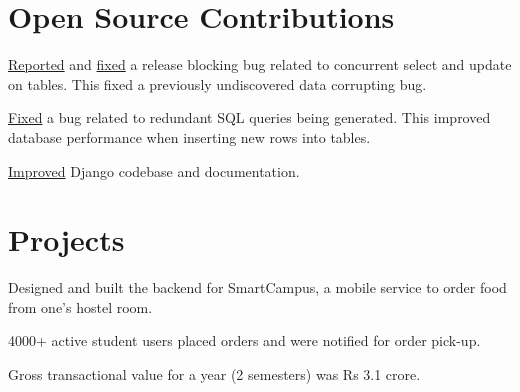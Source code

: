 \documentclass[]{resume}
\begin{document}
\begin{minipage}[t]{0.70\textwidth}
\section{Open Source Contributions}
\vspace{2pt}
\vspace{1pt}
\begin{tightemize}
\item \href{https://code.djangoproject.com/ticket/31246}{Reported} and \href{https://github.com/django/django/pull/12434}{fixed}
a release blocking bug related to concurrent select and update on tables. This fixed a previously undiscovered data corrupting bug.
\item \justifying\href{https://github.com/django/django/pull/12496}{Fixed} a bug related to redundant SQL queries being generated.
This improved database performance when inserting new rows into tables.
\item \justifying \href{https://github.com/django/django/pulls?q=author\%3Aabhijeetviswa}{Improved} Django codebase and documentation.
\end{tightemize}
\subsectionsep

\section{Projects}
\vspace{2pt}
\vspace{2pt}
\begin{tightemize}
 \item Designed and built the backend for SmartCampus, a mobile service to order food from one's hostel room.
 \item 4000+ active student users placed orders and were notified for order pick-up.
 \item Gross transactional value for a year (2 semesters) was Rs 3.1 crore.
\end{tightemize}
\subsectionsep


\end{minipage}
\end{document}
